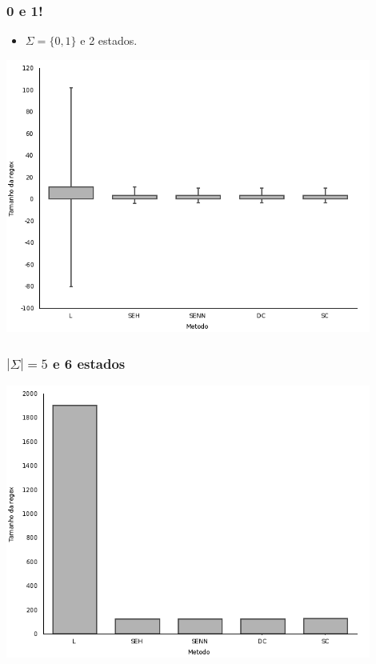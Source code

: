 \documentclass{beamer}
\begin{document}
\begin{frame}[fragile]
  \frametitle{0 e 1!}
  \begin{itemize}
  \item $\Sigma = \{0, 1\}$ e 2 estados.
  \end{itemize}
  \begin{center}
  \includegraphics[width=0.9\textwidth]{plot2_2.png}
  \end{center}
\end{frame}

\begin{frame}[fragile]
  \frametitle{$|\Sigma| = 5$ e 6 estados}
  \begin{center}
  \includegraphics[width=0.9\textwidth]{plot5_6.png}
  \end{center}
\end{frame}
\end{document}

